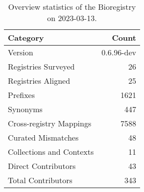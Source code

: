 \begin{table}
\centering
\caption{Overview statistics of the Bioregistry on 2023-03-13.}
\label{tab:bioregistry-summary}
\begin{tabular}{lr}
\toprule
                Category &      Count \\
\midrule
                 Version & 0.6.96-dev \\
     Registries Surveyed &         26 \\
      Registries Aligned &         25 \\
                Prefixes &       1621 \\
                Synonyms &        447 \\
 Cross-registry Mappings &       7588 \\
      Curated Mismatches &         48 \\
Collections and Contexts &         11 \\
     Direct Contributors &         43 \\
      Total Contributors &        343 \\
\bottomrule
\end{tabular}
\end{table}
